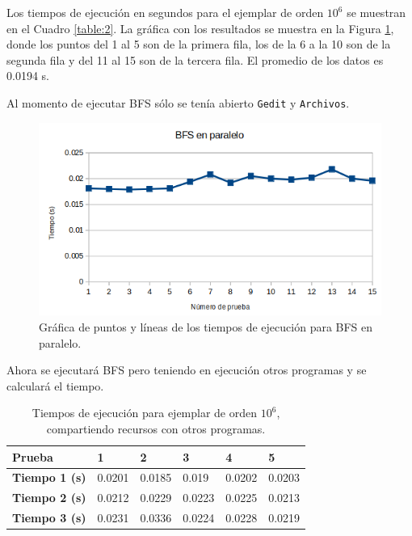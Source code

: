 \documentclass{article}
\begin{document}
Los tiempos de ejecución en segundos para el ejemplar de orden $10^6$ se muestran en el Cuadro \ref{table:2}. La gráfica con los resultados se muestra en la Figura \ref{fig:grafico}, donde los puntos del 1 al 5 son de la primera fila, los de la 6 a la 10 son de la segunda fila y del 11 al 15 son de la tercera fila. El promedio de los datos es 0.0194 s.

Al momento de ejecutar BFS sólo se tenía abierto \texttt{Gedit} y \texttt{Archivos}.

\begin{figure}[htbp]

\center

\includegraphics[scale=0.5]{imagenes/grafico1M}

\caption{Gráfica de puntos y líneas de los tiempos de ejecución para BFS en paralelo.} \label{fig:grafico}

\end{figure}

Ahora se ejecutará BFS pero teniendo en ejecución otros programas y se calculará el tiempo.

\begin{table}[htb]
\begin{center}
\begin{tabular}{|l|l|l|l|l|l|}
\hline
\textbf{Prueba} & \textbf{1} & \textbf{2} & \textbf{3} & \textbf{4} & \textbf{5} \\ \hline
\textbf{Tiempo 1 (s)} & 0.0201 & 0.0185 & 0.019 & 0.0202 & 0.0203 \\ \hline
\textbf{Tiempo 2 (s)} & 0.0212 & 0.0229 & 0.0223 & 0.0225 & 0.0213 \\ \hline
\textbf{Tiempo 3 (s)} & 0.0231 & 0.0336 & 0.0224 & 0.0228 & 0.0219 \\ \hline


\end{tabular}
\caption{Tiempos de ejecución para ejemplar de orden $10^6$, compartiendo recursos con otros programas.} \label{table:3}
\end{center}
\end{table}
\end{document}

